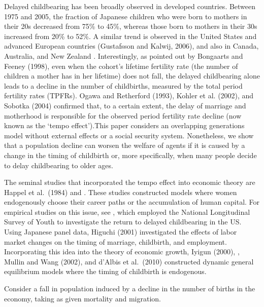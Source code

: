 \documentclass[nogrid]{MBE}%
\begin{document}
{Delayed childbearing has been broadly observed in developed countries. Between 1975 and 2005, the
fraction of Japanese children who were born to mothers in their 20s decreased from 75\% to 45\%,
whereas those born to mothers in their 30s increased from 20\% to 52\%. A similar trend is
observed in the United States and advanced European countries (Gustafsson and Kalwij, 2006), and
also in Canada, Australia, and New Zealand
\citet{Vandenkoornhuyse_Baldauf_Leyval_Straczek_Young:2002}. Interestingly, as pointed out by
Bongaarts and Feeney (1998), even when the cohort's lifetime fertility rate (the number of
children a mother has in her lifetime) does not fall, the delayed childbearing alone leads to a
decline in the number of childbirths, measured by the total period fertility rates (TPFRs). Ogawa
and Retherford (1993), Kohler et al. (2002), and Sobotka (2004) confirmed that, to a certain
extent, the delay of marriage and motherhood is responsible for the observed period fertility rate
decline (now known as the `tempo effect').This paper considers an overlapping generations model
without external effects or a social security system. Nonetheless, we show that a population
decline can worsen the welfare of agents if it is caused by a change in the timing of childbirth
or, more specifically, when many people decide to delay childbearing to older ages.


The seminal studies that incorporated the tempo effect into economic theory are Happel et al.\
(1984) and \citep{Zucker_Mathews_Turner:1999}. These studies constructed models where women
endogenously choose their career paths or the accumulation of human capital. {For empirical
studies on this issue, see \citep{Penny_Hendy:1985}, which employed the National Longitudinal
Survey of Youth to investigate the return to delayed childbearing in the US. Using Japanese panel
data, Higuchi (2001) investigated the effects of labor market changes on the timing of marriage,
childbirth, and employment.} Incorporating this idea into the theory of economic growth, Iyigun
(2000), \citet{Huber:2004}, Mullin and Wang (2002), and d'Albis et al.\ (2010) constructed dynamic
general equilibrium models where
the timing of childbirth is endogenous.%
\begin{arabiclist}
\item Consider a fall in population induced by a decline in the number of births in the economy,
taking as given mortality and migration.


\end{arabiclist}}
\end{document}

